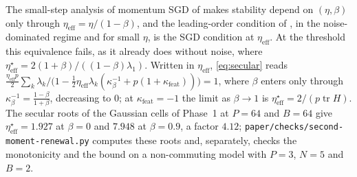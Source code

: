 \documentclass[11pt]{article}
\theoremstyle{remark}
\newcommand{\tr}{\operatorname{tr}}
\begin{document}
The small-step analysis of momentum SGD of \citet{yuan2016momentum} makes stability depend on $(\eta,\beta)$ only through $\eta_{\mathrm{eff}}=\eta/(1-\beta)$, and the leading-order condition of \citet[Theorem~4.1]{andreyev2026momentum}, in the noise-dominated regime and for small $\eta$, is the SGD condition at $\eta_{\mathrm{eff}}$. At the threshold this equivalence fails, as it already does without noise, where $\eta^\star_{\mathrm{eff}}=2(1+\beta)/((1-\beta)\lambda_1)$. Written in $\eta_{\mathrm{eff}}$, \eqref{eq:secular} reads $\frac{\eta_{\mathrm{eff}}p}2\sum_k\lambda_k/\big(1-\frac12\eta_{\mathrm{eff}}\lambda_k(\kappa_\beta^{-1}+p(1+\kappa_{\mathrm{feat}}))\big)=1$, where $\beta$ enters only through $\kappa_\beta^{-1}=\frac{1-\beta}{1+\beta}$, decreasing to $0$; at $\kappa_{\mathrm{feat}}=-1$ the limit as $\beta\to1$ is $\eta^\star_{\mathrm{eff}}=2/(p\tr H)$. The secular roots of the Gaussian cells of Phase~1 at $P=64$ and $B=64$ give $\eta^\star_{\mathrm{eff}}=1.927$ at $\beta=0$ and $7.948$ at $\beta=0.9$, a factor $4.12$; \texttt{paper/checks/second-moment-renewal.py} computes these roots and, separately, checks the monotonicity and the bound on a non-commuting model with $P=3$, $N=5$ and $B=2$.
\end{document}
